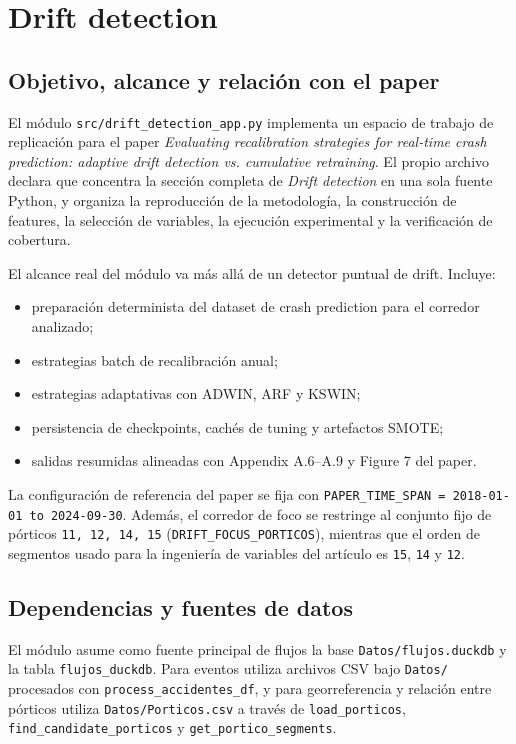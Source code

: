\section{Drift detection}
\label{sec:drift-detection}

\subsection{Objetivo, alcance y relaci\'on con el paper}
El m\'odulo \texttt{src/drift\_detection\_app.py} implementa un espacio de trabajo de replicaci\'on para el paper \textit{Evaluating recalibration strategies for real-time crash prediction: adaptive drift detection vs. cumulative retraining}. El propio archivo declara que concentra la secci\'on completa de \textit{Drift detection} en una sola fuente Python, y organiza la reproducci\'on de la metodolog\'ia, la construcci\'on de features, la selecci\'on de variables, la ejecuci\'on experimental y la verificaci\'on de cobertura.

El alcance real del m\'odulo va m\'as all\'a de un detector puntual de drift. Incluye:
\begin{itemize}[leftmargin=*]
  \item preparaci\'on determinista del dataset de crash prediction para el corredor analizado;
  \item estrategias batch de recalibraci\'on anual;
  \item estrategias adaptativas con ADWIN, ARF y KSWIN;
  \item persistencia de checkpoints, cach\'es de tuning y artefactos SMOTE;
  \item salidas resumidas alineadas con Appendix A.6--A.9 y Figure 7 del paper.
\end{itemize}

La configuraci\'on de referencia del paper se fija con \texttt{PAPER\_TIME\_SPAN = 2018-01-01 to 2024-09-30}. Adem\'as, el corredor de foco se restringe al conjunto fijo de p\'orticos \texttt{11, 12, 14, 15} (\texttt{DRIFT\_FOCUS\_PORTICOS}), mientras que el orden de segmentos usado para la ingenier\'ia de variables del art\'iculo es \texttt{15}, \texttt{14} y \texttt{12}.

\subsection{Dependencias y fuentes de datos}
El m\'odulo asume como fuente principal de flujos la base \texttt{Datos/flujos.duckdb} y la tabla \texttt{flujos\_duckdb}. Para eventos utiliza archivos CSV bajo \texttt{Datos/} procesados con \texttt{process\_accidentes\_df}, y para georreferencia y relaci\'on entre p\'orticos utiliza \texttt{Datos/Porticos.csv} a trav\'es de \texttt{load\_porticos}, \texttt{find\_candidate\_porticos} y \texttt{get\_portico\_segments}.

